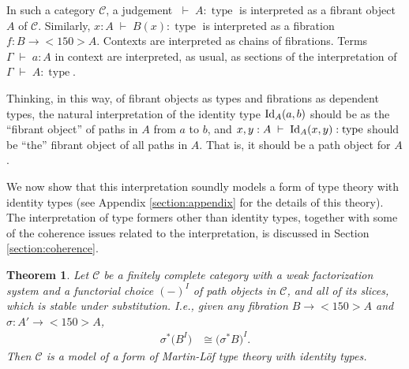 \documentclass{amsart}
\newcommand{\judge}[2]{#1\;\vdash\;#2}
\newcommand{\id}[1]{\textnormal{Id}_{#1}}
\newcommand{\type}{\operatorname{type}}
\newcommand{\iso}{\cong}
\newtheorem{theorem}{Theorem}[section]
\theoremstyle{definition}
\theoremstyle{remark}
\begin{document}
In such a category $\mathcal{C}$, a judgement $\judge{}{A:\type}$ is
interpreted as a fibrant object $A$ of $\mathcal{C}$.
Similarly, $\judge{x:A}{B(x):\type}$ is interpreted as a
fibration $f:B\to<150>A$.  Contexts are interpreted as chains of
fibrations.  Terms $\judge{\Gamma}{a:A}$ in context are interpreted,
as usual, as sections of the interpretation of
$\judge{\Gamma}{A:\type}$.  

Thinking, in this way, of fibrant objects as types and fibrations as
dependent types, the natural interpretation of the identity type
$\id{A}(a,b)$ should be as the ``fibrant object'' of paths in $A$ from $a$ to
$b$, and $\judge{x,y:A}{\id{A}(x,y):\type}$ should be ``the'' fibrant
object of all paths in $A$.  That is, it should be a path object for $A$.

We now show that this interpretation soundly models a form of
type theory with identity types (see Appendix \ref{section:appendix}
for the details of this theory).  The interpretation of type formers
other than identity types, together with some of the coherence issues
related to the interpretation, is discussed in Section \ref{section:coherence}.
\begin{theorem}\label{theorem:main}
  Let $\mathcal{C}$ be a finitely complete category with a weak
  factorization system and a functorial choice $(-)^{I}$ of path
  objects in $\mathcal{C}$, and
  all of its slices, which is stable under substitution.  I.e., given
  any fibration $B\to<150>A$ and $\sigma:A'\to<150>A$,
  \begin{align*}
    \sigma^{*}\bigl(B^{I}\bigr) & \iso \bigl(\sigma^{*}B\bigr)^{I}.
  \end{align*}
  Then $\mathcal{C}$ is a model of a form of Martin-L\"{o}f type theory
  with identity types.  
\end{theorem}
\end{document}
